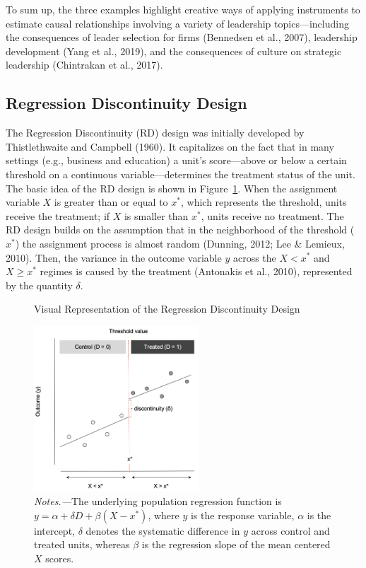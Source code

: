 \documentclass[english]{article}
\begin{document}
To sum up, the three examples highlight creative ways of applying
instruments to estimate causal relationships involving a variety of
leadership topics---including the consequences of leader selection for
firms (Bennedsen et al., 2007), leadership development (Yang et al.,
2019), and the consequences of culture on strategic leadership
(Chintrakan et al., 2017).


\subsection{Regression Discontinuity Design} 

\noindent The Regression Discontinuity (RD) design was initially developed by
Thistlethwaite and Campbell (1960). It capitalizes on the fact that in many
settings (e.g., business and education) a unit's score---above or below a
certain threshold on a continuous variable---determines the treatment status of
the unit. The basic idea of the RD design is shown in Figure~\ref{fig:rdd}.
When the assignment variable $X$ is greater than or equal to
$x^{*}$, which represents the threshold, units receive the treatment; if $X$ is
smaller than $x^{*}$, units receive no treatment. The RD design builds on the
assumption that in the neighborhood of the threshold ($x^{*}$) the  assignment
process is almost random (Dunning, 2012; Lee \& Lemieux, 2010). Then, the
variance in the outcome variable $y$ across the $X < x^{*}$ and $X \geq x^{*}$
regimes is caused by the treatment (Antonakis et al., 2010), represented by the
quantity $\delta$.

\begin{figure}[!htbp]
	\centering
	\caption{Visual Representation of the Regression Discontinuity Design}
	\label{fig:rdd}
	\includegraphics[width=0.55\textwidth]{_6}
	\caption*{\textit{Notes.---}The underlying population regression
	function is $y = \alpha + \delta  D + \beta(X-x^{*})$, where $y$ is
the response variable, $\alpha$ is the intercept, $\delta$ denotes the
systematic difference in $y$ across control and treated units, whereas $\beta$
is the regression slope of the mean centered $X$ scores.}
\end{figure}
\end{document}
